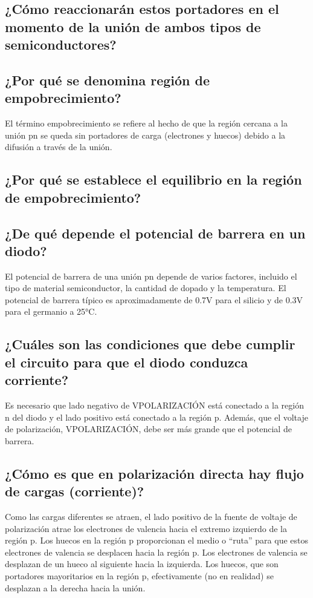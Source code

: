 \subsection{¿Cómo reaccionarán estos portadores en el momento de la unión de ambos tipos de semiconductores?}

\subsection{¿Por qué se denomina región de empobrecimiento?}

El término empobrecimiento se refiere al hecho de que la región cercana a la unión pn se queda sin portadores de carga (electrones y huecos) debido a la difusión a través de la unión.

\subsection{¿Por qué se establece el equilibrio en la región de empobrecimiento?}

\subsection{¿De qué depende el potencial de barrera en un diodo?}

El potencial de barrera de una unión pn depende de varios factores, incluido el tipo de material semiconductor, la cantidad de dopado y la temperatura. El potencial de barrera típico es aproximadamente de 0.7V para el silicio y de 0.3V para el germanio a 25°C.

\subsection{¿Cuáles son las condiciones que debe cumplir el circuito para que el diodo conduzca corriente?}

Es necesario que lado negativo de VPOLARIZACIÓN está conectado a la región n del diodo y el lado positivo está conectado a la región p. Además, que el voltaje de polarización, VPOLARIZACIÓN, debe ser más grande que el potencial de barrera.

\subsection{¿Cómo es que en polarización directa hay flujo de cargas (corriente)?}

Como las cargas diferentes se atraen, el lado positivo de la fuente de voltaje de polarización atrae los electrones de valencia hacia el extremo izquierdo de la región p. Los huecos en la región p proporcionan el medio o “ruta” para que estos electrones de valencia se desplacen hacia la región p. Los electrones de valencia se desplazan de un hueco al siguiente hacia la izquierda. Los huecos, que son portadores mayoritarios en la región p, efectivamente (no en realidad) se desplazan a la derecha hacia la unión.

